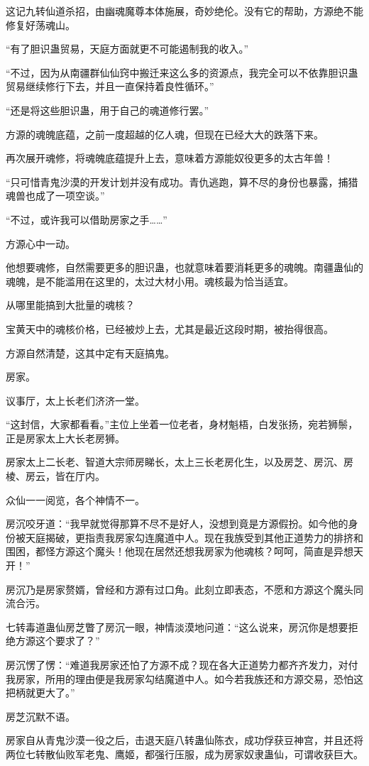 \begin{this_body}
这记九转仙道杀招，由幽魂魔尊本体施展，奇妙绝伦。没有它的帮助，方源绝不能修复好荡魂山。

“有了胆识蛊贸易，天庭方面就更不可能遏制我的收入。”

“不过，因为从南疆群仙仙窍中搬迁来这么多的资源点，我完全可以不依靠胆识蛊贸易继续修行下去，并且一直保持着良性循环。”

“还是将这些胆识蛊，用于自己的魂道修行罢。”

方源的魂魄底蕴，之前一度超越的亿人魂，但现在已经大大的跌落下来。

再次展开魂修，将魂魄底蕴提升上去，意味着方源能奴役更多的太古年兽！

“只可惜青鬼沙漠的开发计划并没有成功。青仇逃跑，算不尽的身份也暴露，捕猎魂兽也成了一项空谈。”

“不过，或许我可以借助房家之手……”

方源心中一动。

他想要魂修，自然需要更多的胆识蛊，也就意味着要消耗更多的魂魄。南疆蛊仙的魂魄，是不能滥用在这里的，太过大材小用。魂核最为恰当适宜。

从哪里能搞到大批量的魂核？

宝黄天中的魂核价格，已经被炒上去，尤其是最近这段时期，被抬得很高。

方源自然清楚，这其中定有天庭搞鬼。

房家。

议事厅，太上长老们济济一堂。

“这封信，大家都看看。”主位上坐着一位老者，身材魁梧，白发张扬，宛若狮鬃，正是房家太上大长老房狮。

房家太上二长老、智道大宗师房睇长，太上三长老房化生，以及房芝、房沉、房棱、房云，皆在厅内。

众仙一一阅览，各个神情不一。

房沉咬牙道：“我早就觉得那算不尽不是好人，没想到竟是方源假扮。如今他的身份被天庭揭破，更指责我房家勾连魔道中人。现在我族受到其他正道势力的排挤和围困，都怪方源这个魔头！他现在居然还想我房家为他魂核？呵呵，简直是异想天开！”

房沉乃是房家赘婿，曾经和方源有过口角。此刻立即表态，不愿和方源这个魔头同流合污。

七转毒道蛊仙房芝瞥了房沉一眼，神情淡漠地问道：“这么说来，房沉你是想要拒绝方源这个要求了？”

房沉愣了愣：“难道我房家还怕了方源不成？现在各大正道势力都齐齐发力，对付我房家，所用的理由便是我房家勾结魔道中人。如今若我族还和方源交易，恐怕这把柄就更大了。”

房芝沉默不语。

房家自从青鬼沙漠一役之后，击退天庭八转蛊仙陈衣，成功俘获豆神宫，并且还将两位七转散仙败军老鬼、鹰姬，都强行压服，成为房家奴隶蛊仙，可谓收获巨大。


\end{this_body}
